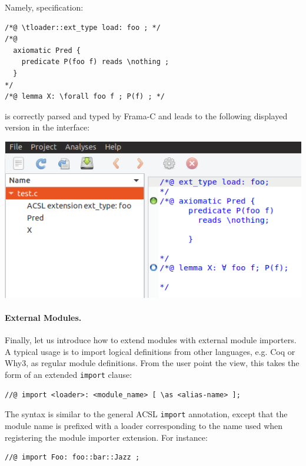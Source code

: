 
Namely, specification:

\begin{lstlisting}[style=c]
/*@ \tloader::ext_type load: foo ; */
/*@
  axiomatic Pred {
    predicate P(foo f) reads \nothing ;
  }
*/
/*@ lemma X: \forall foo f ; P(f) ; */
\end{lstlisting}

is correctly parsed and typed by Frama-C and leads to the following displayed
version in the interface:

\includegraphics[width=\textwidth]{examples/acsl_extension_ext_types/acsl_extension_ext_types}

\paragraph{External Modules.}
\label{par:ext-modules}

Finally, let us introduce how to extend \acsl modules with external module
importers. A typical usage is to import logical definitions from other
languages, e.g. \textsf{Coq} or \textsf{Why3}, as regular \acsl module
definitions. From the user point the view, this takes the form of an extended
\verb+import+ clause:

\begin{lstlisting}[style=c]
//@ import <loader>: <module_name> [ \as <alias-name> ];
\end{lstlisting}

The syntax is similar to the general ACSL \verb+import+ annotation, except that
the module name is prefixed with a loader corresponding to the name used when
registering the module importer extension. For instance:

\begin{lstlisting}[style=c]
//@ import Foo: foo::bar::Jazz ;
\end{lstlisting}

